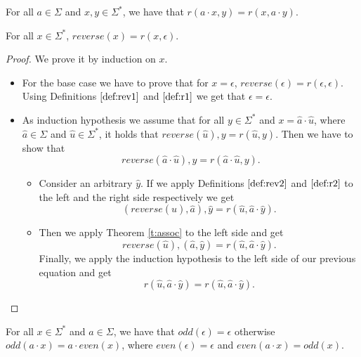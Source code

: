 \begin{definition} For all $a\in \Sigma$ and $x, y\in \Sigma^*$, we have that $r(a \cdot x, y) = r(x, a\cdot y)$.
    \label{def:r2}
\end{definition}

\begin{theorem} For all $x \in \Sigma^*$, $reverse(x) = r(x, \epsilon)$.
\end{theorem}

\begin{proof} We prove it by induction on $x$.
    \begin{itemize}
        \item For the base case we have to prove that for $x=\epsilon$, $reverse(\epsilon) =r(\epsilon, \epsilon)$. Using Definitions $\ref{def:rev1}$ and $\ref{def:r1}$ we get that $\epsilon=\epsilon$.
        \item As induction hypothesis we assume that for all $y \in \Sigma^*$ and $x = \hat{a}\cdot \hat{u}$, where $\hat{a} \in \Sigma$ and $\hat{u}\in\Sigma^*$, it holds that $reverse(\hat{u}), y = r(\hat{u}, y)$. Then we have to show that 
        \begin{equation}
            reverse(\hat{a}\cdot \hat{u}), y = r(\hat{a}\cdot\hat{u}, y).
            \label{eq:rev_ind}
        \end{equation}
        \begin{itemize}
            \item Consider an arbitrary $\hat{y}$. If we apply Definitions $\ref{def:rev2}$ and $\ref{def:r2}$ to the left and the right side respectively we get
            \begin{equation}
                (reverse(\hat{u}), \hat{a}),\hat{y} = r(\hat{u}, \hat{a}\cdot \hat{y}).
            \end{equation}
            \item Then we apply Theorem \ref{t:assoc} to the left side and get
            \begin{equation}
                reverse(\hat{u}), (\hat{a}, \hat{y})= r(\hat{u}, \hat{a}\cdot \hat{y}).
            \end{equation}
            Finally, we apply the induction hypothesis to the left side of our previous equation and get
            \begin{equation}
                r(\hat{u}, \hat{a}\cdot \hat{y}) = r(\hat{u}, \hat{a}\cdot \hat{y}).
            \end{equation}
        \end{itemize}
    \end{itemize}
    
\end{proof}
\begin{definition} For all $x \in \Sigma^*$ and $a \in \Sigma$, we have that $odd(\epsilon) = \epsilon$ otherwise $odd(a\cdot x) = a\cdot even(x)$, where $even(\epsilon) = \epsilon$ and $even(a\cdot x) = odd(x)$.
\end{definition}

